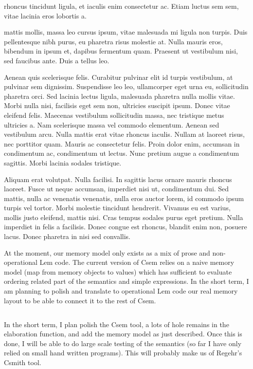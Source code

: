 \documentclass[11pt,a4paper,twocolumn]{article}
\begin{document}
{\color {red}
rhoncus tincidunt ligula, et iaculis enim consectetur ac. Etiam luctus
sem sem, vitae lacinia eros lobortis a.

mattis mollis, massa leo cursus ipsum, vitae malesuada mi ligula non
turpis. Duis pellentesque nibh purus, eu pharetra risus molestie
at. Nulla mauris eros, bibendum in ipsum et, dapibus fermentum
quam. Praesent ut vestibulum nisi, sed faucibus ante. Duis a tellus
leo.

Aenean quis scelerisque felis. Curabitur pulvinar elit id turpis
vestibulum, at pulvinar sem dignissim. Suspendisse leo leo,
ullamcorper eget urna eu, sollicitudin pharetra orci. Sed lacinia
lectus ligula, malesuada pharetra nulla mollis vitae. Morbi nulla
nisi, facilisis eget sem non, ultricies suscipit ipsum. Donec vitae
eleifend felis. Maecenas vestibulum sollicitudin massa, nec tristique
metus ultricies a. Nam scelerisque massa vel commodo elementum. Aenean
sed vestibulum arcu. Nulla mattis erat vitae rhoncus iaculis. Nullam
at laoreet risus, nec porttitor quam. Mauris ac consectetur
felis. Proin dolor enim, accumsan in condimentum ac, condimentum ut
lectus. Nunc pretium augue a condimentum sagittis. Morbi lacinia
sodales tristique.

Aliquam erat volutpat. Nulla facilisi. In sagittis lacus ornare mauris
rhoncus laoreet. Fusce ut neque accumsan, imperdiet nisi ut,
condimentum dui. Sed mattis, nulla ac venenatis venenatis, nulla eros
auctor lorem, id commodo ipsum turpis vel tortor. Morbi molestie
tincidunt hendrerit. Vivamus eu est varius, mollis justo eleifend,
mattis nisi. Cras tempus sodales purus eget pretium. Nulla imperdiet
in felis a facilisis. Donec congue est rhoncus, blandit enim non,
posuere lacus. Donec pharetra in nisi sed convallis.}

At the moment, our memory model only exists as a mix of prose and
non-operational Lem code. The current version of Csem relies on a
naive memory model (map from memory objects to values) which has
sufficient to evaluate ordering related part of the semantics and
simple expressions. In the short term, I am planning to polish and
translate to operational Lem code our real memory layout to be able to
connect it to the rest of Csem.


\subsection*{}

In the short term, I plan polish the Csem tool, a lots of hole remains
in the elaboration function, and add the memory model as just
described. Once this is done, I will be able to do large scale testing
of the semantics (so far I have only relied on small hand written
programs). This will probably make us of Regehr's Csmith tool.
\end{document}
